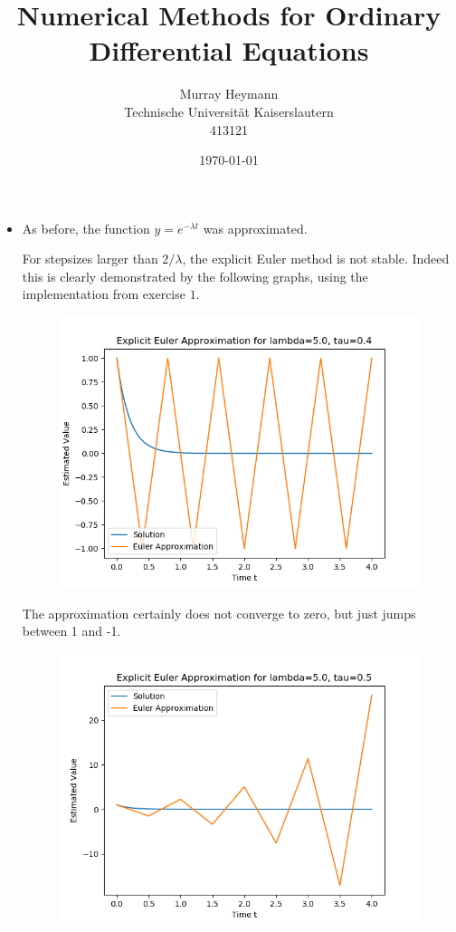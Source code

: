 \documentclass{article}
\title{Numerical Methods for Ordinary Differential Equations}
\author{Murray Heymann \\
	Technische Universit{\"a}t Kaiserslautern \\
	413121}
\date{\today}
\begin{document}
\maketitle


\setcounter{section}{2}
\section{}
\subsection{}

\begin{itemize}
	\item[(a)]
		As before, the function $y = e^{- \lambda t}$ was approximated.

		For stepsizes larger than $2/\lambda$, the explicit Euler method
		is not stable.  Indeed this is clearly demonstrated by the
		following graphs, using the implementation from exercise $1$.
		\begin{figure}[H]
			\includegraphics[scale=0.6]{explicit_euler_04}
		\end{figure}
		The approximation certainly does not
		converge to zero, but just jumps between 1 and -1.
		\begin{figure}[H]
			\includegraphics[scale=0.6]{explicit_euler_05}

\end{figure}
\end{itemize}
\end{document}
